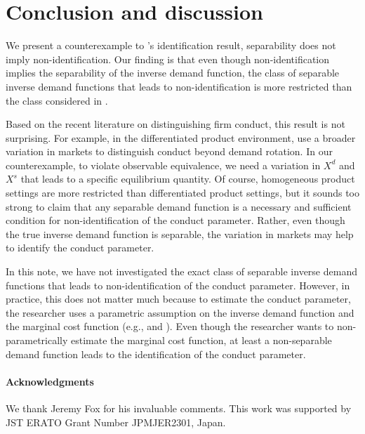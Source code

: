 \documentclass[11pt, a4paper]{article}
\theoremstyle{remark}
\begin{document}
\section{Conclusion and discussion}

We present a counterexample to \citet{lau1982identifying}'s identification result, separability does not imply non-identification.
Our finding is that even though non-identification implies the separability of the inverse demand function, the class of separable inverse demand functions that leads to non-identification is more restricted than the class considered in \citet{lau1982identifying}.

Based on the recent literature on distinguishing firm conduct, this result is not surprising.
For example, in the differentiated product environment, \citet{berry2014identification}  use a broader variation in markets to distinguish conduct beyond demand rotation.
In our counterexample, to violate observable equivalence, we need a variation in $X^{d}$ and $X^{s}$ that leads to a specific equilibrium quantity.
Of course, homogeneous product settings are more restricted than differentiated product settings, but it sounds too strong to claim that any separable demand function is a necessary and sufficient condition for non-identification of the conduct parameter.
Rather, even though the true inverse demand function is separable, the variation in markets may help to identify the conduct parameter.

In this note, we have not investigated the exact class of separable inverse demand functions that leads to non-identification of the conduct parameter.
However, in practice, this does not matter much because to estimate the conduct parameter, the researcher uses a parametric assumption on the inverse demand function and the marginal cost function (e.g., \citet{okazaki2022excess} and \citet{matsumura2024loglinear}).
Even though the researcher wants to non-parametrically estimate the marginal cost function, at least a non-separable demand function leads to the identification of the conduct parameter.

\paragraph{Acknowledgments}
We thank Jeremy Fox for his invaluable comments.
This work was supported by JST ERATO Grant Number JPMJER2301, Japan.  


\newpage


\end{document}
